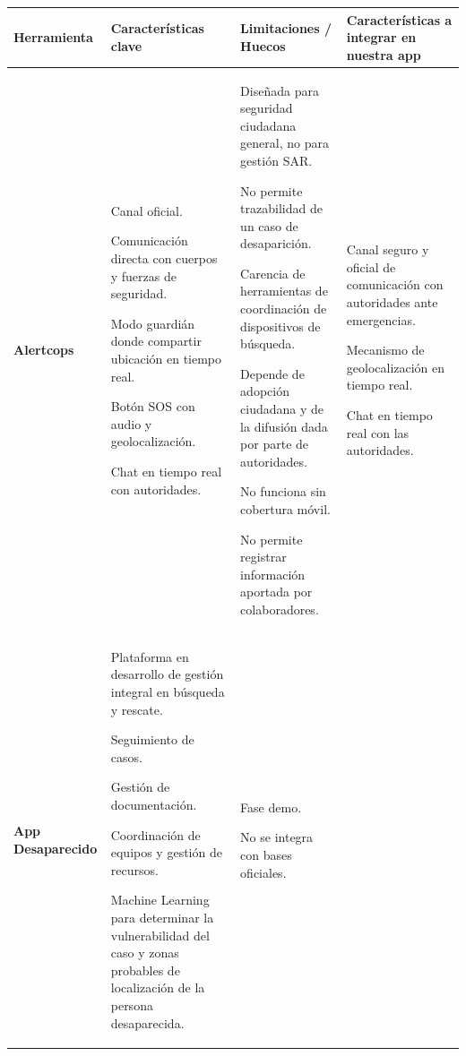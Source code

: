     
\begin{table}[htbp]
\centering
\footnotesize
\begin{tabular}{ |m{2cm}|m{5cm}|m{4cm}|m{3cm}|  } 
\hline
\cellcolor[HTML]{B9E3F0}\centering\textbf{Herramienta} & \cellcolor[HTML]{B9E3F0}\textbf{Características clave}& \cellcolor[HTML]{B9E3F0}\textbf{Limitaciones / Huecos}& \cellcolor[HTML]{B9E3F0}\textbf{Características a integrar en nuestra app}\\

\hline
\cellcolor[HTML]{EFEFEF}\textbf{Alertcops} 
    & {Canal oficial.
    
    Comunicación directa con cuerpos y fuerzas de seguridad.
    
    Modo guardián donde compartir ubicación en tiempo real.
    
    Botón SOS con audio y geolocalización.
    
    Chat en tiempo real con autoridades.
    } 
    & {Diseñada para seguridad ciudadana general, no para gestión SAR.
    
    No permite trazabilidad de un caso de desaparición.
    
    Carencia de herramientas de coordinación de dispositivos de búsqueda.
    
    Depende de adopción ciudadana y de la difusión dada por parte de autoridades.
    
    No funciona sin cobertura móvil.

    No permite registrar información aportada por colaboradores.
    } 
    & {Canal seguro y oficial de comunicación con autoridades ante emergencias. 
    
    Mecanismo de geolocalización en tiempo real.
    
    Chat en tiempo real con las autoridades.
    }\\
\hline
\cellcolor[HTML]{EFEFEF}\textbf{App Desaparecido} 
    & {Plataforma en desarrollo de gestión integral en búsqueda y rescate.

    Seguimiento de casos. 
    
    Gestión de documentación.
    
    Coordinación de equipos y gestión de recursos.
    
    Machine Learning para determinar la vulnerabilidad del caso y zonas probables de localización de la persona desaparecida.
    } 
    & {Fase demo.
 
    No se integra con bases oficiales. 
    
}
\end{tabular}
\end{table}
